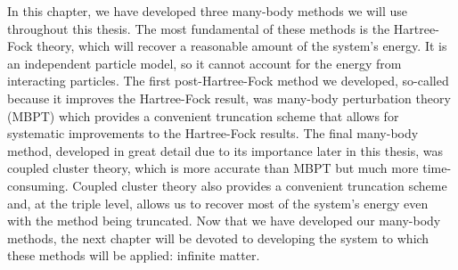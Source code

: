 In this chapter, we have developed three many-body methods we will use throughout this thesis. The most fundamental of these methods is the Hartree-Fock theory, which will recover a reasonable amount of the system's energy. It is an independent particle model, so it cannot account for the energy from interacting particles. The first post-Hartree-Fock method we developed, so-called because it improves the Hartree-Fock result, was many-body perturbation theory (MBPT) which provides a convenient truncation scheme that allows for systematic improvements to the Hartree-Fock results. The final many-body method, developed in great detail due to its importance later in this thesis, was coupled cluster theory, which is more accurate than MBPT but much more time-consuming. Coupled cluster theory also provides a convenient truncation scheme and, at the triple level, allows us to recover most of the system's energy even with the method being truncated. Now that we have developed our many-body methods, the next chapter will be devoted to developing the system to which these methods will be applied: infinite matter.